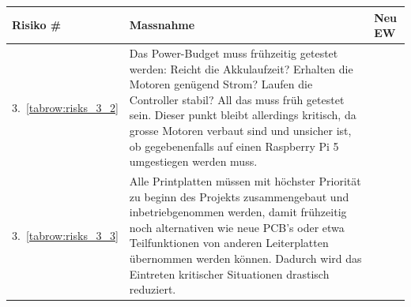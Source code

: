 \documentclass[main.tex]{subfiles} %
\begin{document}
\begin{table}[H]
    \begin{tabularx}{\textwidth}{|>{\centering\arraybackslash}p{2cm}|>{\raggedright\arraybackslash}X|>{\centering\arraybackslash}p{0.75cm}|}
        \hline
        \textbf{Risiko \#}        & \textbf{Massnahme}
                                  & \textbf{Neu EW}                                                                                                                                                                                                                                                                                                                              \\
        \hline
        \rowcolor{yellow!30}
        3.~\ref{tabrow:risks_3_2} & Das Power-Budget muss frühzeitig getestet werden: Reicht die Akkulaufzeit? Erhalten die Motoren genügend Strom? Laufen die Controller stabil? All das muss früh getestet sein. Dieser punkt bleibt allerdings kritisch, da grosse Motoren verbaut sind und unsicher ist, ob gegebenenfalls auf einen Raspberry Pi 5 umgestiegen werden muss.
                                  & 2                                                                                                                                                                                                                                                                                                                                            \\
        \hline
        \rowcolor{green!30}
        3.~\ref{tabrow:risks_3_3} & Alle Printplatten müssen mit höchster Priorität zu beginn des Projekts zusammengebaut und inbetriebgenommen werden, damit frühzeitig noch alternativen wie neue PCB's oder etwa Teilfunktionen von anderen Leiterplatten übernommen werden können. Dadurch wird das Eintreten kritischer Situationen drastisch reduziert.
                                  & 1                                                                                                                                                                                                                                                                                                                                            \\
        \hline

\end{tabularx}
\end{table}
\end{document}
